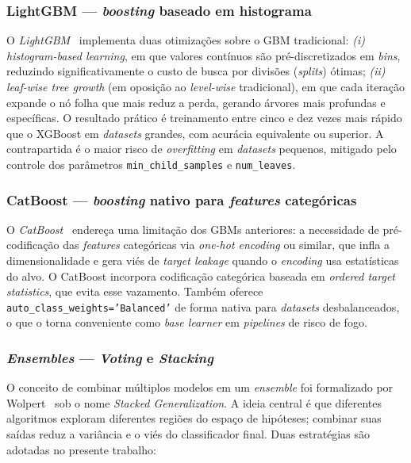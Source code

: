 \subsubsection{LightGBM --- \emph{boosting} baseado em histograma}
\label{subsec:fund_lightgbm}

O \emph{LightGBM}~\cite{ke2017lightgbm} implementa duas otimizações sobre o GBM tradicional: \emph{(i)} \emph{histogram-based learning}, em que valores contínuos são pré-discretizados em \emph{bins}, reduzindo significativamente o custo de busca por divisões (\emph{splits}) ótimas; \emph{(ii)} \emph{leaf-wise tree growth} (em oposição ao \emph{level-wise} tradicional), em que cada iteração expande o nó folha que mais reduz a perda, gerando árvores mais profundas e específicas. O resultado prático é treinamento entre cinco e dez vezes mais rápido que o XGBoost em \emph{datasets} grandes, com acurácia equivalente ou superior. A contrapartida é o maior risco de \emph{overfitting} em \emph{datasets} pequenos, mitigado pelo controle dos parâmetros \texttt{min\_child\_samples} e \texttt{num\_leaves}.

\subsubsection{CatBoost --- \emph{boosting} nativo para \emph{features} categóricas}
\label{subsec:fund_catboost}

O \emph{CatBoost}~\cite{prokhorenkova2018catboost} endereça uma limitação dos GBMs anteriores: a necessidade de pré-codificação das \emph{features} categóricas via \emph{one-hot encoding} ou similar, que infla a dimensionalidade e gera viés de \emph{target leakage} quando o \emph{encoding} usa estatísticas do alvo. O CatBoost incorpora codificação categórica baseada em \emph{ordered target statistics}, que evita esse vazamento. Também oferece \texttt{auto\_class\_weights='Balanced'} de forma nativa para \emph{datasets} desbalanceados, o que o torna conveniente como \emph{base learner} em \emph{pipelines} de risco de fogo.

\subsubsection{\emph{Ensembles} --- \emph{Voting} e \emph{Stacking}}
\label{subsec:fund_ensembles}

O conceito de combinar múltiplos modelos em um \emph{ensemble} foi formalizado por Wolpert~\cite{wolpert1992stacked} sob o nome \emph{Stacked Generalization}. A ideia central é que diferentes algoritmos exploram diferentes regiões do espaço de hipóteses; combinar suas saídas reduz a variância e o viés do classificador final. Duas estratégias são adotadas no presente trabalho:

